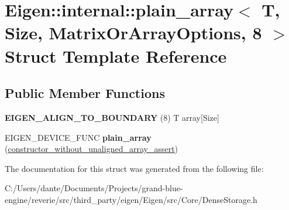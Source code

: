 \hypertarget{struct_eigen_1_1internal_1_1plain__array_3_01_t_00_01_size_00_01_matrix_or_array_options_00_018_01_4}{}\section{Eigen\+::internal\+::plain\+\_\+array$<$ T, Size, Matrix\+Or\+Array\+Options, 8 $>$ Struct Template Reference}
\label{struct_eigen_1_1internal_1_1plain__array_3_01_t_00_01_size_00_01_matrix_or_array_options_00_018_01_4}
\subsection*{Public Member Functions}
\begin{DoxyCompactItemize}
\item 
\mbox{\label{struct_eigen_1_1internal_1_1plain__array_3_01_t_00_01_size_00_01_matrix_or_array_options_00_018_01_4_abd9f738535f730c17f744f00c0bc7db1}} 
{\bfseries E\+I\+G\+E\+N\+\_\+\+A\+L\+I\+G\+N\+\_\+\+T\+O\+\_\+\+B\+O\+U\+N\+D\+A\+RY} (8) T array\mbox{[}Size\mbox{]}
\item 
\mbox{\label{struct_eigen_1_1internal_1_1plain__array_3_01_t_00_01_size_00_01_matrix_or_array_options_00_018_01_4_a857fc25d08c572951cda04c51f5343d3}} 
E\+I\+G\+E\+N\+\_\+\+D\+E\+V\+I\+C\+E\+\_\+\+F\+U\+NC {\bfseries plain\+\_\+array} (\mbox{\hyperlink{struct_eigen_1_1internal_1_1constructor__without__unaligned__array__assert}{constructor\+\_\+without\+\_\+unaligned\+\_\+array\+\_\+assert}})
\end{DoxyCompactItemize}


The documentation for this struct was generated from the following file\+:\begin{DoxyCompactItemize}
\item 
C\+:/\+Users/dante/\+Documents/\+Projects/grand-\/blue-\/engine/reverie/src/third\+\_\+party/eigen/\+Eigen/src/\+Core/Dense\+Storage.\+h\end{DoxyCompactItemize}
